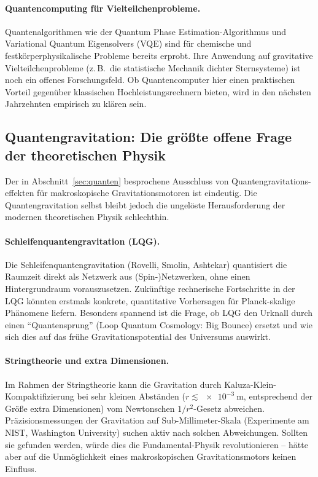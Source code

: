 ﻿\documentclass[12pt, a4paper]{report}
\theoremstyle{definition}
\theoremstyle{remark}
\begin{document}
\paragraph{Quantencomputing für Vielteilchenprobleme.}
Quantenalgorithmen wie der Quantum Phase Estimation-Algorithmus und Variational
Quantum Eigensolvers (VQE) sind für chemische und festkörperphysikalische
Probleme bereits erprobt. Ihre Anwendung auf gravitative Vielteilchenprobleme
(z.\,B.\ die statistische Mechanik dichter Sternsysteme) ist noch ein offenes
Forschungsfeld. Ob Quantencomputer hier einen praktischen Vorteil gegenüber
klassischen Hochleistungsrechnern bieten, wird in den nächsten Jahrzehnten
empirisch zu klären sein.

\subsection{Quantengravitation: Die größte offene Frage der theoretischen
               Physik}

Der in Abschnitt~\ref{sec:quanten} besprochene Ausschluss von Quantengravitations-
effekten für makroskopische Gravitationsmotoren ist eindeutig. Die Quantengravitation
selbst bleibt jedoch die ungelöste Herausforderung der modernen theoretischen
Physik schlechthin.

\paragraph{Schleifenquantengravitation (LQG).}
Die Schleifenquantengravitation (Rovelli, Smolin, Ashtekar) quantisiert die
Raumzeit direkt als Netzwerk aus (Spin-)Netzwerken, ohne einen Hintergrundraum
vorauszusetzen. Zukünftige rechnerische Fortschritte in der LQG könnten
erstmals konkrete, quantitative Vorhersagen für Planck-skalige Phänomene liefern.
Besonders spannend ist die Frage, ob LQG den Urknall durch einen ``Quantensprung''
(Loop Quantum Cosmology: Big Bounce) ersetzt und wie sich dies auf das frühe
Gravitationspotential des Universums auswirkt.

\paragraph{Stringtheorie und extra Dimensionen.}
Im Rahmen der Stringtheorie kann die Gravitation durch Kaluza-Klein-Kompaktifizierung
bei sehr kleinen Abständen ($r \lesssim \SI{e-3}{\metre}$, entsprechend der
Größe extra Dimensionen) vom Newtonschen $1/r^2$-Gesetz abweichen. Präzisionsmessungen
der Gravitation auf Sub-Millimeter-Skala (Experimente am NIST, Washington University)
suchen aktiv nach solchen Abweichungen. Sollten sie gefunden werden, würde dies
die Fundamental-Physik revolutionieren -- hätte aber auf die Unmöglichkeit eines
makroskopischen Gravitationsmotors keinen Einfluss.
\end{document}
